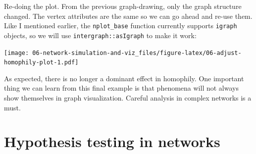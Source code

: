 \documentclass[]{book}
\newenvironment{Shaded}{\begin{snugshade}}{\end{snugshade}}
\newcommand{\CommentTok}[1]{\textcolor[rgb]{0.56,0.35,0.01}{\textit{#1}}}
\newcommand{\DataTypeTok}[1]{\textcolor[rgb]{0.13,0.29,0.53}{#1}}
\newcommand{\DecValTok}[1]{\textcolor[rgb]{0.00,0.00,0.81}{#1}}
\newcommand{\KeywordTok}[1]{\textcolor[rgb]{0.13,0.29,0.53}{\textbf{#1}}}
\newcommand{\NormalTok}[1]{#1}
\newcommand{\OperatorTok}[1]{\textcolor[rgb]{0.81,0.36,0.00}{\textbf{#1}}}
\newcommand{\StringTok}[1]{\textcolor[rgb]{0.31,0.60,0.02}{#1}}
\begin{document}
Re-doing the plot. From the previous graph-drawing, only the graph structure
changed. The vertex attributes are the same so we can go ahead and re-use them.
Like I mentioned earlier, the \texttt{nplot\_base} function currently supports \texttt{igraph}
objects, so we will use \texttt{intergraph::asIgraph} to make it work:

\begin{Shaded}
\end{Shaded}

\texttt{[image: 06-network-simulation-and-viz\_files/figure-latex/06-adjust-homophily-plot-1.pdf]}

As expected, there is no longer a dominant effect in homophily. One important
thing we can learn from this final example is that phenomena will not always
show themselves in graph visualization. Careful analysis in complex networks
is a must.

\hypertarget{hypothesis-testing-in-networks}{%
\chapter{Hypothesis testing in networks}\label{hypothesis-testing-in-networks}}
\end{document}
